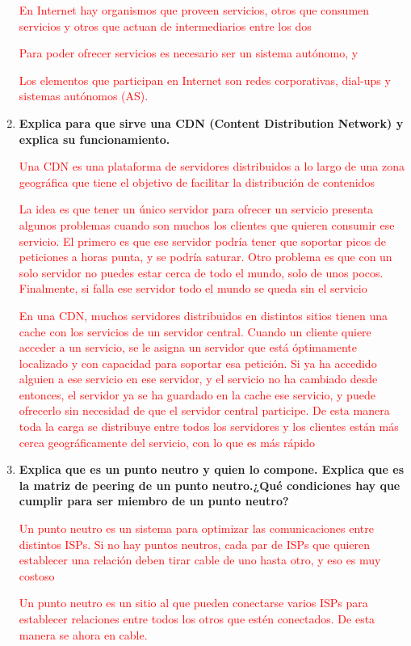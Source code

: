 \documentclass[a4paper,10pt]{article}
\newcommand{\red}[1]{\textcolor{red}{#1}}
\begin{document}
\begin{enumerate}
\red{En Internet hay organismos que proveen servicios, otros que consumen servicios y otros que actuan de intermediarios entre los dos}

\red{Para poder ofrecer servicios es necesario ser un sistema autónomo, y }

\red{Los elementos que participan en Internet son redes corporativas, dial-ups y sistemas autónomos (AS). }
  \item \textbf{Explica para que sirve una CDN (Content Distribution Network) y explica su
funcionamiento.}

\red{Una CDN es una plataforma de servidores distribuidos a lo largo de una zona geográfica que tiene el objetivo de facilitar la distribución de contenidos}

\red{La idea es que tener un único servidor para ofrecer un servicio presenta algunos problemas cuando son muchos los clientes que quieren consumir ese servicio. El primero es que ese servidor podría tener que soportar picos de peticiones a horas punta, y se podría saturar. Otro problema es que con un solo servidor no puedes estar cerca de todo el mundo, solo de unos pocos. Finalmente, si falla ese servidor todo el mundo se queda sin el servicio}

\red{En una CDN, muchos servidores distribuidos en distintos sitios tienen una cache con los servicios de un servidor central. Cuando un cliente quiere acceder a un servicio, se le asigna un servidor que está óptimamente localizado y con capacidad para soportar esa petición. Si ya ha accedido alguien a ese servicio en ese servidor, y el servicio no ha cambiado desde entonces, el servidor ya se ha guardado en la cache ese servicio, y puede ofrecerlo sin necesidad de que el servidor central participe. De esta manera toda la carga se distribuye entre todos los servidores y los clientes están más cerca geográficamente del servicio, con lo que es más rápido}


  \item \textbf{Explica que es un punto neutro y quien lo compone. Explica que es la matriz de peering
de un punto neutro.¿Qué condiciones hay que cumplir para ser miembro de un punto neutro?}

\red{Un punto neutro es un sistema para optimizar las comunicaciones entre distintos ISPs. Si no hay puntos neutros, cada par de ISPs que quieren establecer una relación deben tirar cable de uno hasta otro, y eso es muy costoso}

\red{Un punto neutro es un sitio al que pueden conectarse varios ISPs para establecer relaciones entre todos los otros que estén conectados. De esta manera se ahora en cable.}


\end{enumerate}
\end{document}
